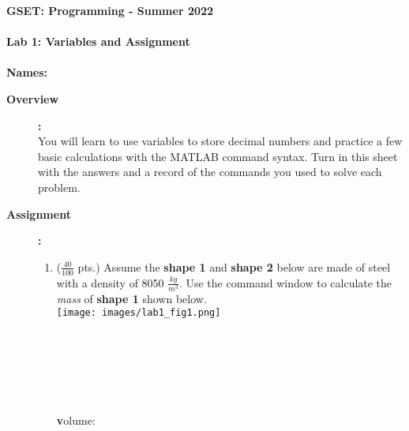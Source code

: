 \documentclass[11pt]{article}
\newcommand{\secNum}{GSET: Programming}
\newcommand{\assnType}{Lab}
\newcommand{\assnTitle}{Variables and Assignment}
\newcommand{\assnNum}{1}
\newcommand{\currTerm}{Summer 2022}
\begin{document}
	\textbf{\LARGE \secNum \hspace{1mm} - \hspace{1mm} \currTerm} \\\\
	\textbf{\LARGE \assnType \hspace{1mm}  \assnNum : \assnTitle} \\\\
	\textbf{Names:\underline{\hspace{140mm}} } \\
	\begin{description}

		\item [\textbf{ \large Overview}] \textbf{ \Large :}\\
			You will learn to use variables to store decimal numbers and practice a few basic calculations with the MATLAB command syntax. Turn in this sheet with the answers and a record of the commands you used to solve each problem.

        \item [\textbf{ \large Assignment}] \textbf{ \Large :}
            \begin{enumerate}
            \item ($\frac{40}{100}$ pts.)
            Assume the {\bf shape 1} and {\bf shape 2} below are made of steel with a density of 8050 $\frac{kg}{m^3}$. Use the command window to calculate the {\it mass} of {\bf shape 1} shown below.\\
            
            	\texttt{[image: images/lab1\_fig1.png]}\\
               
\underline{\hspace{140mm}}\\\\
\underline{\hspace{140mm}}\\\\
\underline{\hspace{140mm}}\\\\

{\textbf volume: \underline{\hspace{60mm}}}\\

\underline{\hspace{140mm}}\\\\
\underline{\hspace{140mm}}\\\\
\underline{\hspace{140mm}}\\\\		
	

\end{enumerate}
\end{description}
\end{document}

